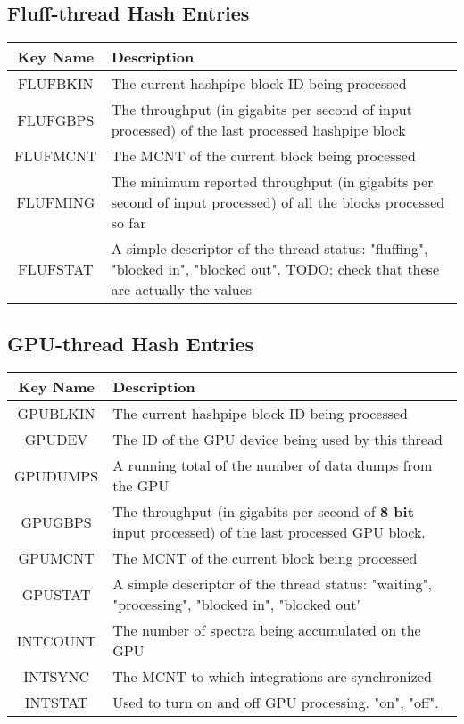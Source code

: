 \documentclass{article}
\begin{document}
\subsection{Fluff-thread Hash Entries}

\begin{centering}
\begin{tabular}{c p{}}
\hline
Key Name & Description \\
\hline
\hline
FLUFBKIN & The current hashpipe block ID being processed \\
FLUFGBPS & The throughput (in gigabits per second of input processed) of the last processed hashpipe block \\
FLUFMCNT & The MCNT of the current block being processed \\
FLUFMING & The minimum reported throughput (in gigabits per second of input processed) of all the blocks processed so far \\
FLUFSTAT & A simple descriptor of the thread status: "fluffing", "blocked in", "blocked out". TODO: check that these are actually the values \\
\end{tabular}
\end{centering}


\subsection{GPU-thread Hash Entries}

\begin{centering}
\begin{tabular}{c p{}}
\hline
Key Name & Description \\
\hline
\hline
GPUBLKIN & The current hashpipe block ID being processed \\
GPUDEV   & The ID of the GPU device being used by this thread \\
GPUDUMPS & A running total of the number of data dumps from the GPU \\
GPUGBPS  & The throughput (in gigabits per second of \textbf{8 bit} input processed) of the last processed GPU block. \\
GPUMCNT  & The MCNT of the current block being processed \\
GPUSTAT  & A simple descriptor of the thread status: "waiting", "processing", "blocked in", "blocked out" \\
INTCOUNT & The number of spectra being accumulated on the GPU \\
INTSYNC  & The MCNT to which integrations are synchronized \\
INTSTAT  & Used to turn on and off GPU processing. "on", "off". \\
\end{tabular}
\end{centering}
\end{document}
